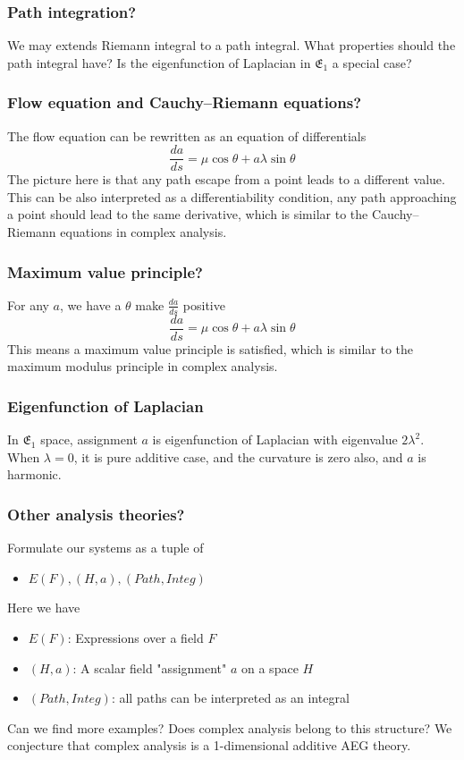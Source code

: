 \documentclass[aspectratio=169]{beamer}
\begin{document}
\begin{frame}
    \frametitle{Path integration?}
    We may extends Riemann integral to a path integral.
    What properties should the path integral have? Is the eigenfunction of Laplacian in $\mathfrak{E}_1$ a special case?
\end{frame}

\begin{frame}
    \frametitle{Flow equation and Cauchy–Riemann equations?}
    The flow equation can be rewritten as an equation of differentials
    \[
        \frac{da}{ds} = \mu \cos \theta + a \lambda \sin \theta
    \]
    The picture here is that any path escape from a point leads to a different value.
    This can be also interpreted as a differentiability condition, any path approaching a point should lead to the same
    derivative, which is similar to the Cauchy–Riemann equations in complex analysis.
\end{frame}

\begin{frame}
    \frametitle{Maximum value principle?}
    For any $a$, we have a $\theta$ make $\frac{da}{ds}$ positive
    \[
        \frac{da}{ds} = \mu \cos \theta + a \lambda \sin \theta
    \]
    This means a maximum value principle is satisfied,
    which is similar to the maximum modulus principle in complex analysis.
\end{frame}

\begin{frame}
    \frametitle{Eigenfunction of Laplacian}
    In $\mathfrak{E_1}$ space, assignment $a$ is eigenfunction of Laplacian with eigenvalue $2 \lambda^2$.
    When $\lambda = 0$, it is pure additive case, and the curvature is zero also, and $a$ is harmonic.
\end{frame}

\begin{frame}
    \frametitle{Other analysis theories?}
    Formulate our systems as a tuple of
    \begin{itemize}
        \item $E(F), (H, a), (Path, Integ)$
    \end{itemize}
    Here we have
    \begin{itemize}
        \item $E(F)$: Expressions over a field $F$
        \item $(H, a)$: A scalar field "assignment" $a$ on a space $H$
        \item $(Path, Integ)$: all paths can be interpreted as an integral
    \end{itemize}
    Can we find more examples? Does complex analysis belong to this structure?
    We conjecture that complex analysis is a 1-dimensional additive AEG theory.
\end{frame}
\end{document}
